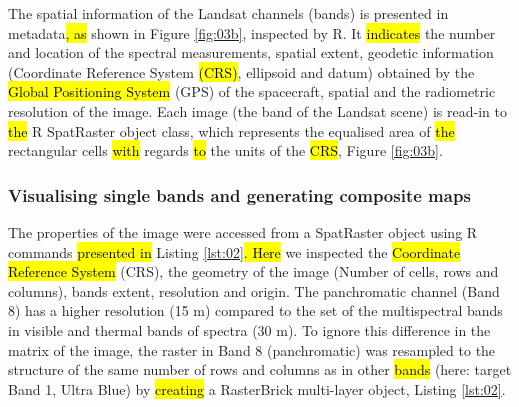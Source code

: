 \documentclass[jimaging,article,submit,pdftex,moreauthors]{Definitions/mdpi}
\begin{document}
The spatial information of the Landsat channels (bands) is presented in metadata\hl{, as} shown in Figure \ref{fig:03b}, inspected by R. It \hl{indicates} the number and location of the spectral measurements, spatial extent, geodetic information (Coordinate Reference System \hl{(CRS)}, ellipsoid and datum) obtained by the \hl{Global Positioning System} (GPS) of the spacecraft, spatial and the radiometric resolution of the image. Each image (the band of the Landsat scene) is read-in to \hl{the} R SpatRaster object class, which represents the equalised area of \hl{the} rectangular cells \hl{with} regards \hl{to} the units of the \hl{CRS}, Figure \ref{fig:03b}. 

\subsubsection{Visualising single bands and generating composite maps}

The properties of the image were accessed from a SpatRaster object using R commands \hl{presented in} Listing \ref{lst:02}\hl{. Here} we inspected the \hl{Coordinate Reference System} (CRS), the geometry of the image (Number of cells, rows and columns), bands extent, resolution and origin. The panchromatic channel (Band 8) has a higher resolution (15 m) compared to the set of the multispectral bands in visible and thermal bands of spectra (30 m). To ignore this difference in the matrix of the image, the raster in Band 8 (panchromatic) was resampled to the structure of the same number of rows and columns as in other \hl{bands} (here: target Band 1, Ultra Blue) by \hl{creating} a RasterBrick multi-layer object, Listing \ref{lst:02}. 
\end{document}
